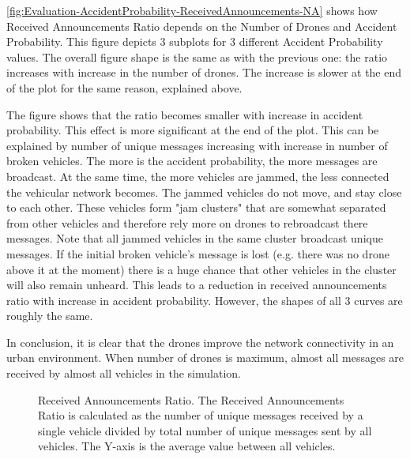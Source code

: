 \documentclass[]{nsm-thesis}
\begin{document}

\cref{fig:Evaluation-AccidentProbability-ReceivedAnnouncements-NA} shows how Received Announcements Ratio depends on the Number of Drones and Accident Probability. This figure depicts 3 subplots for 3 different Accident Probability values. The overall figure shape is the same as with the previous one: the ratio increases with increase in the number of drones. The increase is slower at the end of the plot for the same reason, explained above. 

The figure shows that the ratio becomes smaller with increase in accident probability. This effect is more significant at the end of the plot. This can be explained by number of unique messages increasing with increase in number of broken vehicles. The more is the accident probability, the more messages are broadcast. At the same time, the more vehicles are jammed, the less connected the vehicular network becomes. The jammed vehicles do not move, and stay close to each other. These vehicles form "jam clusters" that are somewhat separated from other vehicles and therefore rely more on drones to rebroadcast there messages. Note that all jammed vehicles in the same cluster broadcast unique messages. If the initial broken vehicle's message is lost (e.g. there was no drone above it at the moment) there is a huge chance that other vehicles in the cluster will also remain unheard. This leads to a reduction in received announcements ratio with increase in accident probability. However, the shapes of all 3 curves are roughly the same.

In conclusion, it is clear that the drones improve the network connectivity in an urban environment. When number of drones is maximum, almost all messages are received by almost all vehicles in the simulation.

\begin{figure}%
	\centering
	\hfill
	\hfill
	\caption{Received Announcements Ratio. The Received Announcements Ratio is calculated as the number of unique messages received by a single vehicle divided by total number of unique messages sent by all vehicles. The Y-axis is the average value between all vehicles.}%
	\label{fig:Evaluation-ReceivedAnnouncements}%
\end{figure}
\end{document}
